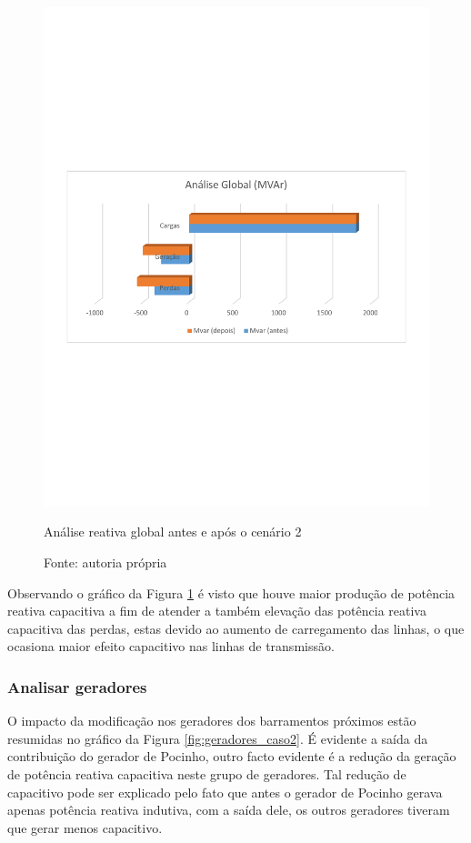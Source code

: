 \begin{figure}[H]
	\centering
	\captionsetup{width=\textwidth, font=footnotesize, textfont=bf}	
	\includegraphics[width=\linewidth,trim = 20mm 97mm 20mm 105mm,clip]{img/global_MVAr_caso2.pdf}
	\caption{Análise reativa global antes e após o cenário 2}
	\vspace{-3.5mm}
	\caption*{Fonte: autoria própria}
	\label{fig:global_MVAr_caso2}
\end{figure}

Observando o gráfico da Figura \ref{fig:global_MVAr_caso2} é visto que houve maior produção de potência reativa capacitiva a fim de atender a também elevação das potência reativa capacitiva das perdas, estas devido ao aumento de carregamento das linhas, o que ocasiona maior efeito capacitivo nas linhas de transmissão.

\subsubsection{Analisar geradores}
O impacto da modificação nos geradores dos barramentos próximos estão resumidas no gráfico da Figura \ref{fig:geradores_caso2}. É evidente a saída da contribuição do gerador de Pocinho, outro facto evidente é a redução da geração de potência reativa capacitiva neste grupo de geradores. Tal redução de capacitivo pode ser explicado pelo fato que antes o gerador de Pocinho gerava apenas potência reativa indutiva, com a saída dele, os outros geradores tiveram que gerar menos capacitivo. 

